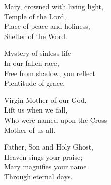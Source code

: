 \hymn

\settowidth{\versewidth}{Mary, crowned with living light,}

\begin{hymnverse}%
Mary, crowned with living light,\\
Temple of the Lord,\\
Place of peace and holiness,\\
Shelter of the Word.

Mystery of sinless life\\
In our fallen race,\\
Free from shadow, you reflect\\
Plentitude of grace.

Virgin Mother of our God,\\
Lift us when we fall,\\
Who were named upon the Cross\\
Mother of us all.

Father, Son and Holy Ghost,\\
Heaven sings your praise;\\
Mary magnifies your name\\
Through eternal days.
\end{hymnverse}

